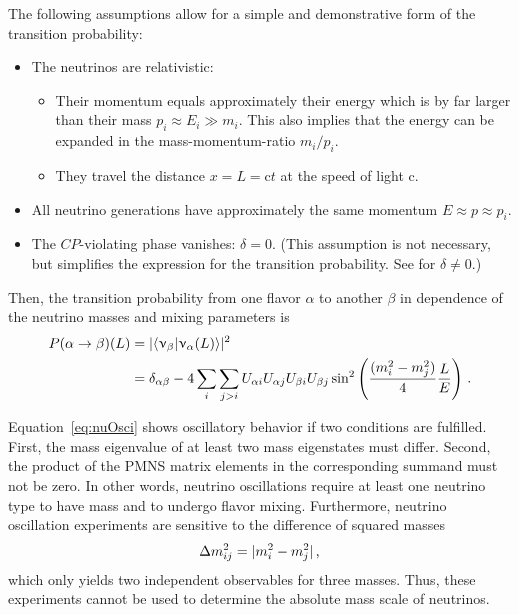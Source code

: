 The following assumptions allow for a simple and demonstrative form of the transition probability:
\begin{itemize}
    \renewcommand{\labelitemi}{$\bullet$}
    \renewcommand{\labelitemii}{$\circ$}
    \item The neutrinos are relativistic: 
    \begin{itemize}
        \item Their momentum equals approximately their energy which is by far larger than their mass $p_i \approx E_i \gg m_i$. This also implies that the energy can be expanded in the mass-momentum-ratio $m_i/p_i$.
        \item They travel the distance $x=L=\mathrm{c}t$ at the speed of light $\mathrm{c}$.
    \end{itemize}
    \item All neutrino generations have approximately the same momentum $E \approx p \approx p_i$.
    \item The $CP$-violating phase vanishes: $\delta=0$. (This assumption is not necessary, but simplifies the expression for the transition probability. See \cite{zuber2011neutrino} for $\delta \neq 0$.)
\end{itemize}
Then, the transition probability from one flavor $\alpha$ to another $\beta$ in dependence of the neutrino masses and mixing parameters is
\begin{equation}
    \begin{split}
    P(\alpha \rightarrow \beta)(L) 
    &= \lvert\left\langle\upnu_\beta \middle| \upnu_\alpha(L)\right\rangle\rvert^2 \\
    &= 
    \delta_{\alpha\beta}-
    4\sum_{i}\sum_{j>i} U_{\alpha i} U_{\alpha j} U_{\beta i} U_{\beta j} 
    \sin^2\left( \frac{(m_i^2-m_j^2)}{4} \frac{L}{E} \right)
    \text{\,.}
    \end{split}
    \label{eq:nuOsci}
\end{equation}

Equation~\eqref{eq:nuOsci} shows oscillatory behavior if two conditions are fulfilled. First, the mass eigenvalue of at least two mass eigenstates must differ. Second, the product of the PMNS matrix elements in the corresponding summand must not be zero. In other words, neutrino oscillations require at least one neutrino type to have mass and to undergo flavor mixing. Furthermore, neutrino oscillation experiments are sensitive to the difference of squared masses 
\begin{equation}
    \label{eq:massSquaredDiff}
    \Delta m^2_{ij} =  \lvert m^2_i - m^2_j\rvert
    \text{\,,}
\end{equation}
which only yields two independent observables for three masses. Thus, these experiments cannot be used to determine the absolute mass scale of neutrinos.

